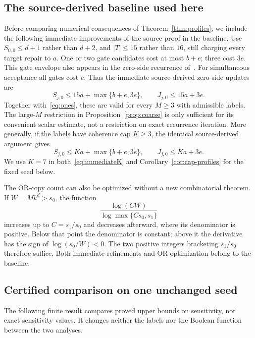 \documentclass[11pt]{amsart}
\theoremstyle{definition}
\theoremstyle{remark}
\begin{document}
\subsection{The source-derived baseline used here}\label{sec:baseline}
Before comparing numerical consequences of Theorem~\ref{thm:profiles},
we include the following immediate improvements of the source proof
in the baseline. Use $S_{0,0}\le d+1$ rather than $d+2$, and
$|T|\le15$ rather than $16$, still charging every target repair to
$a$. One or two gate candidates cost at most $b+e$; three cost $3e$.
This gate envelope also appears in the zero-side recurrence
of~\cite{ProveItI}.
For simultaneous acceptance all gates cost $e$. Thus the immediate
source-derived zero-side updates are
\begin{equation}\label{eq:immediate}
 S_{j,0}\le15a+\max\{b+e,3e\},\qquad
 J_{j,0}\le15a+3e.
\end{equation}
Together with~\eqref{eq:ones}, these are valid for every $M\ge3$
with admissible labels. The large-$M$ restriction in
Proposition~\ref{prop:coarse} is only sufficient for its convenient
scalar estimate, not a restriction on exact recurrence iteration.
More generally, if the labels have coherence cap $K\ge3$, the identical
source-derived argument gives
\begin{equation}\label{eq:immediateK}
 S_{j,0}\le Ka+\max\{b+e,3e\},\qquad
 J_{j,0}\le Ka+3e.
\end{equation}
We use $K=7$ in both~\eqref{eq:immediateK} and
Corollary~\ref{cor:cap-profiles} for the fixed seed below.

The OR-copy count can also be optimized without a new combinatorial
theorem. If $W=Mk^d>s_0$, the function
\[
 \frac{\log(CW)}{\log\max\{Cs_0,s_1\}}
\]
increases up to $C=s_1/s_0$ and decreases afterward, where its
denominator is positive. Below that point the denominator is constant;
above it the derivative has the sign of $\log(s_0/W)<0$.
The two positive integers bracketing $s_1/s_0$ therefore suffice.
Both immediate refinements and OR optimization belong to the baseline.

\subsection{Certified comparison on one unchanged seed}\label{sec:numerical}
The following finite result compares proved upper bounds on sensitivity,
not exact sensitivity values. It changes neither the labels nor the
Boolean function between the two analyses.
\end{document}
